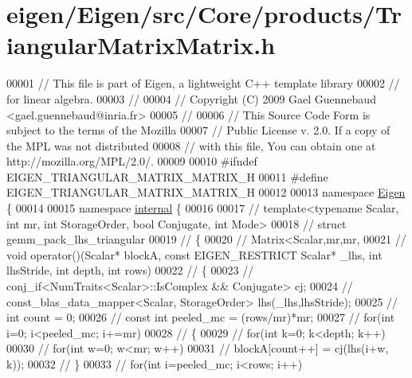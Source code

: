 \hypertarget{eigen_2_eigen_2src_2_core_2products_2_triangular_matrix_matrix_8h_source}{}\section{eigen/\+Eigen/src/\+Core/products/\+Triangular\+Matrix\+Matrix.h}
\label{eigen_2_eigen_2src_2_core_2products_2_triangular_matrix_matrix_8h_source}

\begin{DoxyCode}
00001 \textcolor{comment}{// This file is part of Eigen, a lightweight C++ template library}
00002 \textcolor{comment}{// for linear algebra.}
00003 \textcolor{comment}{//}
00004 \textcolor{comment}{// Copyright (C) 2009 Gael Guennebaud <gael.guennebaud@inria.fr>}
00005 \textcolor{comment}{//}
00006 \textcolor{comment}{// This Source Code Form is subject to the terms of the Mozilla}
00007 \textcolor{comment}{// Public License v. 2.0. If a copy of the MPL was not distributed}
00008 \textcolor{comment}{// with this file, You can obtain one at http://mozilla.org/MPL/2.0/.}
00009 
00010 \textcolor{preprocessor}{#ifndef EIGEN\_TRIANGULAR\_MATRIX\_MATRIX\_H}
00011 \textcolor{preprocessor}{#define EIGEN\_TRIANGULAR\_MATRIX\_MATRIX\_H}
00012 
00013 \textcolor{keyword}{namespace }\hyperlink{namespace_eigen}{Eigen} \{ 
00014 
00015 \textcolor{keyword}{namespace }\hyperlink{namespaceinternal}{internal} \{
00016 
00017 \textcolor{comment}{// template<typename Scalar, int mr, int StorageOrder, bool Conjugate, int Mode>}
00018 \textcolor{comment}{// struct gemm\_pack\_lhs\_triangular}
00019 \textcolor{comment}{// \{}
00020 \textcolor{comment}{//   Matrix<Scalar,mr,mr,}
00021 \textcolor{comment}{//   void operator()(Scalar* blockA, const EIGEN\_RESTRICT Scalar* \_lhs, int lhsStride, int depth, int rows)}
00022 \textcolor{comment}{//   \{}
00023 \textcolor{comment}{//     conj\_if<NumTraits<Scalar>::IsComplex && Conjugate> cj;}
00024 \textcolor{comment}{//     const\_blas\_data\_mapper<Scalar, StorageOrder> lhs(\_lhs,lhsStride);}
00025 \textcolor{comment}{//     int count = 0;}
00026 \textcolor{comment}{//     const int peeled\_mc = (rows/mr)*mr;}
00027 \textcolor{comment}{//     for(int i=0; i<peeled\_mc; i+=mr)}
00028 \textcolor{comment}{//     \{}
00029 \textcolor{comment}{//       for(int k=0; k<depth; k++)}
00030 \textcolor{comment}{//         for(int w=0; w<mr; w++)}
00031 \textcolor{comment}{//           blockA[count++] = cj(lhs(i+w, k));}
00032 \textcolor{comment}{//     \}}
00033 \textcolor{comment}{//     for(int i=peeled\_mc; i<rows; i++)}

\end{DoxyCode}
